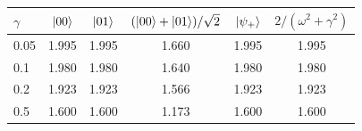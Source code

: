 \begin{tabular}{@{}lccccc@{}}
\toprule
$\gamma$ & $\left|00\right\rangle$ & $\left|01\right\rangle$ & $(\left|00\right\rangle+\left|01\right\rangle)/\sqrt2$ & $\left|\psi_+\right\rangle$ & $2/(\omega^2+\gamma^2)$\\
\midrule
0.05 & 1.995 & 1.995 & 1.660 & 1.995 & 1.995\\
0.1 & 1.980 & 1.980 & 1.640 & 1.980 & 1.980\\
0.2 & 1.923 & 1.923 & 1.566 & 1.923 & 1.923\\
0.5 & 1.600 & 1.600 & 1.173 & 1.600 & 1.600\\
\bottomrule
\end{tabular}
